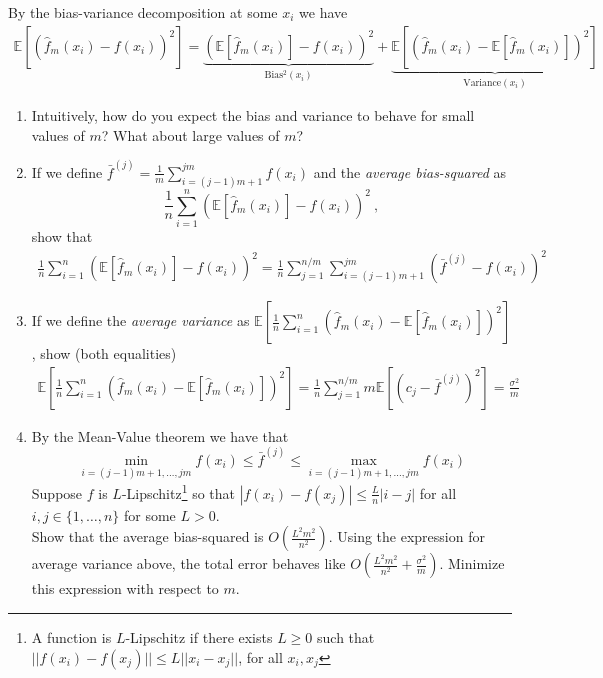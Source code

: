 \documentclass{article}
\begin{document}
\begin{bprob}
    By the bias-variance decomposition at some $x_i$ we have
    \begin{align*}
        \mathbb{E}\left[ (\widehat{f}_m(x_i) - f(x_i))^2 \right] = \underbrace{ (\mathbb{E}[\widehat{f}_m(x_i)] - f(x_i))^2}_{\text{Bias$^2$}(x_i)} + \underbrace{\mathbb{E}\left[(\widehat{f}_m(x_i) - \mathbb{E}[\widehat{f}_m(x_i)])^2 \right]}_{\text{Variance}(x_i)}
    \end{align*} 
    \begin{enumerate}
        \item {} Intuitively, how do you expect the bias and variance to behave for small values of $m$? What about large values of $m$?
        \item {} If we define $\bar{f}^{(j)} = \frac{1}{m} \sum_{i=(j-1)m + 1}^{jm} f(x_i)$ and the \emph{average bias-squared} as
        \[
        \frac{1}{n} \sum_{i=1}^n (\mathbb{E}[\widehat{f}_m(x_i)] - f(x_i))^2\ ,\]
        show that 
        \begin{align*}
            \frac{1}{n} \sum_{i=1}^n (\mathbb{E}[\widehat{f}_m(x_i)] - f(x_i))^2 = \frac{1}{n}\sum_{j=1}^{n/m} \sum_{i=(j-1)m+1}^{jm} (\bar{f}^{(j)} - f(x_i))^2
        \end{align*}
        \item {} If we define the \emph{average variance} as $\mathbb{E}\left[\frac{1}{n} \sum_{i=1}^n(\widehat{f}_m(x_i) - \mathbb{E}[\widehat{f}_m(x_i)])^2 \right]$, show (both equalities)
        \begin{align*}
            \mathbb{E}\left[\frac{1}{n} \sum_{i=1}^n(\widehat{f}_m(x_i) - \mathbb{E}[\widehat{f}_m(x_i)])^2 \right] = \frac{1}{n}\sum_{j=1}^{n/m} m \mathbb{E}[ (c_j - \bar{f}^{(j)})^2 ] = \frac{\sigma^2}{m}
        \end{align*}
        \item {} By the Mean-Value theorem we have that $$\min_{i=(j-1)m+1,\dots, jm} f(x_i) \leq \bar{f}^{(j)} \leq \max_{i=(j-1)m+1,\dots, jm} f(x_i)$$ 
        Suppose $f$ is {$L$-Lipschitz}\footnote{A function is $L$-Lipschitz if there exists $L \geq 0$ such that $||f(x_i) - f(x_j)|| \leq L||x_i-x_j||$, for all $x_i, x_j$} so that $|f(x_i) - f(x_j)| \leq \frac{L}{n} |i-j|$ for all $i,j \in \{1,\dots,n \}$ for some $L > 0$.  \\
        \break
        Show that the average bias-squared is $O(\frac{L^2 m^2}{n^2})$.  Using the expression for average variance above, the total error behaves like $O(\frac{L^2 m^2}{n^2} + \frac{\sigma^2}{m})$. Minimize this expression with respect to $m$. \\

\end{enumerate}
\end{bprob}
\end{document}
